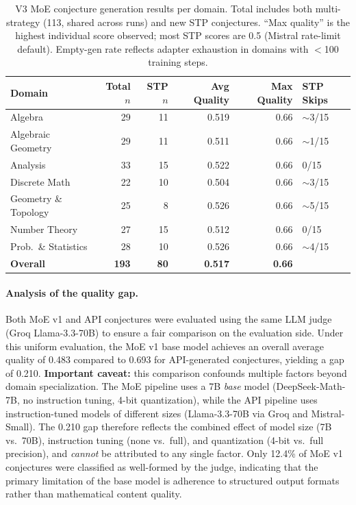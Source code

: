 \documentclass[11pt,a4paper]{article}
\begin{document}
\begin{table}[t]
\centering
\caption{V3 MoE conjecture generation results per domain. Total includes both multi-strategy (113, shared across runs) and new STP conjectures. ``Max quality'' is the highest individual score observed; most STP scores are 0.5 (Mistral rate-limit default). Empty-gen rate reflects adapter exhaustion in domains with $<$100 training steps.}
\label{tab:v3_moe_domain}
\small
\begin{tabular}{@{}lrrrrl@{}}
\toprule
\textbf{Domain} & \textbf{Total $n$} & \textbf{STP $n$} & \textbf{Avg Quality} & \textbf{Max Quality} & \textbf{STP Skips} \\
\midrule
Algebra             & 29 & 11 & 0.519 & 0.66 & $\sim$3/15 \\
Algebraic Geometry  & 29 & 11 & 0.511 & 0.66 & $\sim$1/15 \\
Analysis            & 33 & 15 & 0.522 & 0.66 & 0/15 \\
Discrete Math       & 22 & 10 & 0.504 & 0.66 & $\sim$3/15 \\
Geometry \& Topology & 25 & 8  & 0.526 & 0.66 & $\sim$5/15 \\
Number Theory       & 27 & 15 & 0.512 & 0.66 & 0/15 \\
Prob.\ \& Statistics & 28 & 10 & 0.526 & 0.66 & $\sim$4/15 \\
\midrule
\textbf{Overall}    & \textbf{193} & \textbf{80} & \textbf{0.517} & \textbf{0.66} & \\
\bottomrule
\end{tabular}
\end{table}

\paragraph{Analysis of the quality gap.}
Both MoE v1 and API conjectures were evaluated using the same LLM judge (Groq Llama-3.3-70B) to ensure a fair comparison on the evaluation side. Under this uniform evaluation, the MoE v1 base model achieves an overall average quality of 0.483 compared to 0.693 for API-generated conjectures, yielding a gap of 0.210. \textbf{Important caveat:} this comparison confounds multiple factors beyond domain specialization. The MoE pipeline uses a 7B \emph{base} model (DeepSeek-Math-7B, no instruction tuning, 4-bit quantization), while the API pipeline uses instruction-tuned models of different sizes (Llama-3.3-70B via Groq and Mistral-Small). The 0.210 gap therefore reflects the combined effect of model size (7B vs.\ 70B), instruction tuning (none vs.\ full), and quantization (4-bit vs.\ full precision), and \emph{cannot} be attributed to any single factor. Only 12.4\% of MoE v1 conjectures were classified as well-formed by the judge, indicating that the primary limitation of the base model is adherence to structured output formats rather than mathematical content quality.
\end{document}
